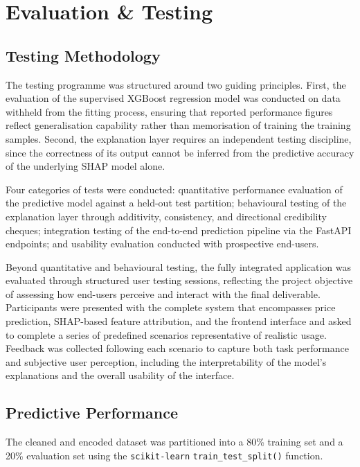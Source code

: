 \chapter{Evaluation \& Testing}
\label{ch:Evaluation}


\section{Testing Methodology}

The testing programme was structured around two guiding principles. First, the evaluation of the supervised XGBoost regression model was conducted on data withheld from the fitting process, ensuring that reported performance figures reflect generalisation capability rather than  memorisation of training the training samples. Second, the explanation layer requires an independent testing discipline, since the correctness of its output cannot be inferred from the predictive accuracy of the underlying SHAP model alone. 

Four categories of tests were conducted: quantitative performance evaluation of the predictive model against a held-out test partition; behavioural testing of the explanation layer through additivity, consistency, and directional credibility cheques; integration testing of the end-to-end prediction pipeline via the FastAPI endpoints; and usability evaluation conducted with 
prospective end-users.

Beyond quantitative and behavioural testing, the fully integrated application was evaluated through structured user testing sessions, reflecting the project objective of assessing how end-users perceive and interact with the final deliverable. Participants were presented with the complete system that encompasses price prediction, SHAP-based feature attribution, and the frontend interface  and asked to complete a series of predefined scenarios representative of realistic usage. Feedback was collected following each scenario to capture both task performance and subjective user perception, including the interpretability of the model's explanations and the overall usability of the interface.


\section{Predictive Performance}

The cleaned and encoded dataset was partitioned into a 80\% training set and a 20\% evaluation set using the \verb|scikit-learn| \verb|train_test_split()| function.

